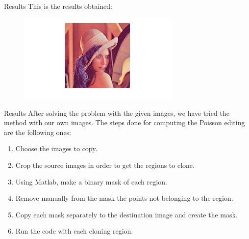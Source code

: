 \documentclass[11pt]{beamer}
\begin{document}
\begin{frame}{Results}
This is the results obtained:
\begin{figure}
    \centering
    \includegraphics[width=80mm]{lena_result}
\end{figure}
\end{frame}

\begin{frame}{Results}
After solving the problem with the given images, we have tried the method with our own images. The steps done for computing the Poisson editing are the following ones:
\begin{enumerate}
    \item Choose the images to copy.
    \item Crop the source images in order to get the regions to clone.
    \item Using Matlab, make a binary mask of each region.
    \item Remove manually from the mask the points not belonging to the region.
    \item Copy each mask separately to the destination image and create the mask.
    \item Run the code with each cloning region.
\end{enumerate}
\end{frame}
\end{document}
